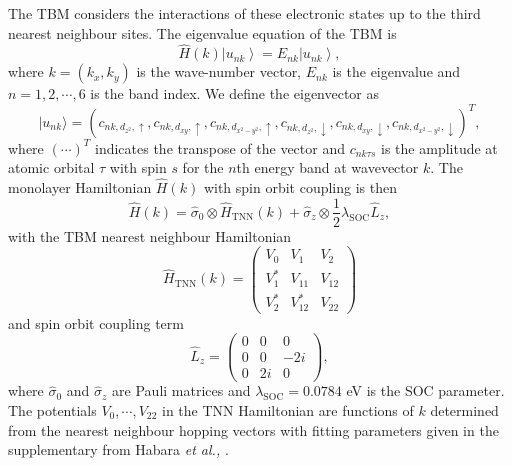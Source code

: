 \documentclass[12pt]{report} %
\begin{document}
  The TBM considers the interactions of these electronic states up to the third nearest neighbour sites. The eigenvalue equation of the TBM is 
      \begin{equation}
        \label{TBM_evalue_eqn}
        \hat{H}(k)\left|u_{n k}\right\rangle=E_{n k}\left|u_{n k}\right\rangle,
      \end{equation}
   where $k=\left(k_{x}, k_{y}\right)$ is the wave-number vector, $E_{nk}$ is the eigenvalue and $n = 1,2,\cdots,6$ is the band index. We define the eigenvector as
      \begin{equation}
          |u_{n k}\rangle=(c_{n k, d_{z^{2}}, \uparrow}, c_{n k, d_{x y}, \uparrow}, c_{n k, d_{x^{2}-y^{2}}, \uparrow}, c_{n k, d_{z^{2}}, \downarrow}, c_{n k, d_{x y}, \downarrow}, c_{n k, d_{x^{2}-y^{2}}, \downarrow})^{T},
      \end{equation}
%
  where $(\cdots)^T$ indicates the transpose of the vector and $c_{nk\tau s}$ is the amplitude at atomic orbital $\tau$ with spin $s$ for the $n$th energy band at wavevector $k$. The monolayer Hamiltonian $\hat{H}(k)$ with spin orbit coupling is then 
      \begin{equation}
        \hat{H}(k)=\hat{\sigma}_{0} \otimes \hat{H}_{\mathrm{TNN}}(k)+\hat{\sigma}_{z} \otimes \frac{1}{2} \lambda_{\mathrm{SOC}} \hat{L}_{z},
        \label{monolayer_hamitonian}
      \end{equation}
%
  with the TBM nearest neighbour Hamiltonian
%
      \begin{equation}
        \hat{H}_{\mathrm{TNN}}(k)=\left(\begin{array}{ccc}
        V_{0} & V_{1} & V_{2} \\
        V_{1}^{*} & V_{11} & V_{12} \\
        V_{2}^{*} & V_{12}^{*} & V_{22}
        \end{array}\right)
      \end{equation}
%
  and spin orbit coupling term
%
      \begin{equation}
        \hat{L}_{z}=\left(\begin{array}{ccc}
        0 & 0 & 0 \\
        0 & 0 & -2 i \\
        0 & 2 i & 0
        \end{array}\right),
      \end{equation}
%
  where $\hat{\sigma}_0$ and $\hat{\sigma}_z$ are Pauli matrices and $\lambda_{\text{SOC}}=0.0784$ eV is the SOC parameter. The potentials $V_0, \cdots, V_{22}$ in the TNN Hamiltonian are functions of $k$ determined from the nearest neighbour hopping vectors with fitting parameters given in the supplementary from Habara \textit{et al.,} \cite{Habara2021}.
\end{document}
